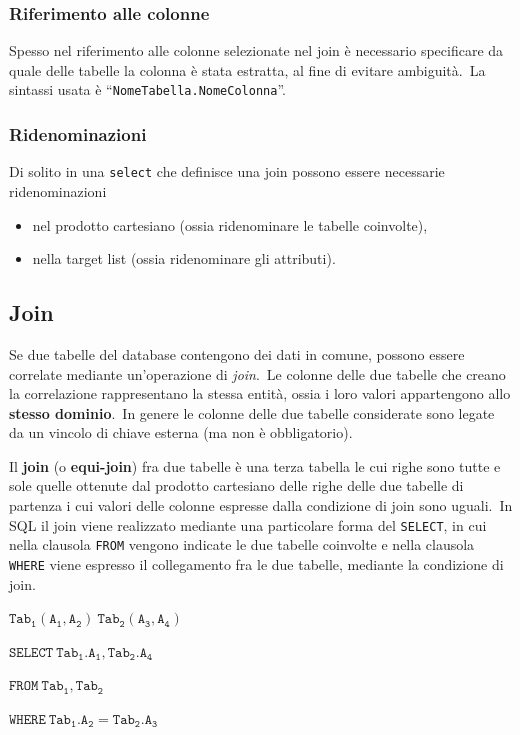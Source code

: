 \subsubsection{Riferimento alle colonne}
Spesso nel riferimento alle colonne selezionate nel join è necessario specificare da quale delle tabelle la colonna è stata estratta, al fine di evitare ambiguità.\
La sintassi usata è ``\texttt{NomeTabella.NomeColonna}''.

\subsubsection{Ridenominazioni}

Di solito in una \texttt{select} che definisce una join possono essere necessarie ride\-nominazioni
\begin{itemize}
	\item nel prodotto cartesiano (ossia ridenominare le tabelle coinvolte),
	\item nella target list (ossia ridenominare gli attributi).
\end{itemize}

\subsection{Join}

Se due tabelle del database contengono dei dati in comune, possono essere correlate mediante un'operazione di \textit{join}.\
Le colonne delle due tabelle che creano la correlazione rappresentano la stessa entità, ossia i loro valori appartengono allo \textbf{stesso dominio}.\
In genere le colonne delle due tabelle considerate sono legate da un vincolo di chiave esterna (ma non è obbligatorio).

Il \textbf{join} (o \textbf{equi-join}) fra due tabelle è una terza tabella le cui righe sono tutte e sole quelle ottenute dal prodotto cartesiano delle righe delle due tabelle di partenza i cui valori delle colonne espresse dalla condizione di join sono uguali.\
In SQL il join viene realizzato mediante una particolare forma del \texttt{SELECT}, in cui nella clausola \texttt{FROM} vengono indicate le due tabelle coinvolte e nella clausola \texttt{WHERE} viene espresso il collegamento fra le due tabelle, mediante la condizione di join.

\begin{flushleft}
	$\mathtt{Tab_1(A_1,A_2)\ Tab_2(A_3,A_4)}$

	\quad $\mathtt{SELECT\ Tab_1.A_1, Tab_2.A_4}$

	\quad $\mathtt{FROM\ Tab_1, Tab_2}$

	\quad $\mathtt{WHERE\ Tab_1.A_2 = Tab_2.A_3}$
\end{flushleft}

